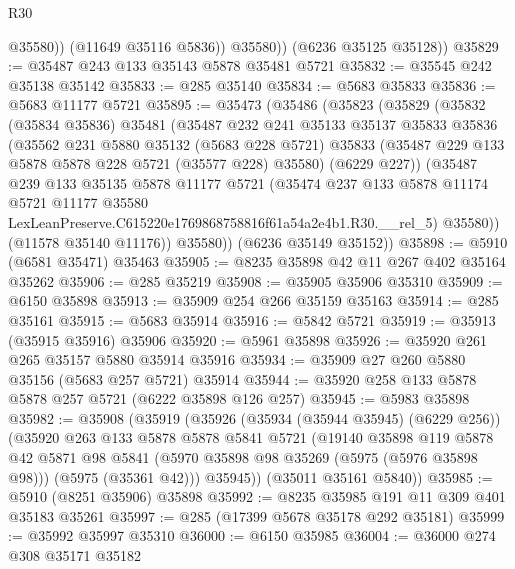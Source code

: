 \begin{lexlean}{R30}
\begin{coremodule}
                @35580))
            (@11649 @35116 @5836))
          @35580))
      (@6236 @35125 @35128))
@35829 := @35487 @243 @133 @35143 @5878 @35481 @5721
@35832 := @35545 @242 @35138 @35142
@35833 := @285 @35140
@35834 := @5683 @35833
@35836 := @5683 @11177 @5721
@35895 := @35473
    (@35486
      (@35823
        (@35829
          (@35832
            (@35834 @35836)
            @35481
            (@35487
              @232
              @241
              @35133
              @35137
              @35833
              @35836
              (@35562
                @231
                @5880
                @35132
                (@5683 @228 @5721)
                @35833
                (@35487 @229 @133 @5878 @5878 @228 @5721 (@35577 @228) @35580)
                (@6229 @227))
              (@35487
                @239
                @133
                @35135
                @5878
                @11177
                @5721
                (@35474
                  @237
                  @133
                  @5878
                  @11174
                  @5721
                  @11177
                  @35580
                  LexLeanPreserve.C615220e1769868758816f61a54a2e4b1.R30.__rel_5)
                @35580))
            (@11578 @35140 @11176))
          @35580))
      (@6236 @35149 @35152))
@35898 := @5910 (@6581 @35471) @35463
@35905 := @8235 @35898 @42 @11 @267 @402 @35164 @35262
@35906 := @285 @35219
@35908 := @35905 @35906 @35310
@35909 := @6150 @35898
@35913 := @35909 @254 @266 @35159 @35163
@35914 := @285 @35161
@35915 := @5683 @35914
@35916 := @5842 @5721
@35919 := @35913 (@35915 @35916) @35906
@35920 := @5961 @35898
@35926 := @35920 @261 @265 @35157 @5880 @35914 @35916
@35934 := @35909 @27 @260 @5880 @35156 (@5683 @257 @5721) @35914
@35944 := @35920 @258 @133 @5878 @5878 @257 @5721 (@6222 @35898 @126 @257)
@35945 := @5983 @35898
@35982 := @35908
    (@35919
      (@35926
        (@35934 (@35944 @35945) (@6229 @256))
        (@35920
          @263
          @133
          @5878
          @5878
          @5841
          @5721
          (@19140
            @35898
            @119
            @5878
            @42
            @5871
            @98
            @5841
            (@5970 @35898 @98 @35269 (@5975 (@5976 @35898 @98)))
            (@5975 (@35361 @42)))
          @35945))
      (@35011 @35161 @5840))
@35985 := @5910 (@8251 @35906) @35898
@35992 := @8235 @35985 @191 @11 @309 @401 @35183 @35261
@35997 := @285 (@17399 @5678 @35178 @292 @35181)
@35999 := @35992 @35997 @35310
@36000 := @6150 @35985
@36004 := @36000 @274 @308 @35171 @35182

\end{coremodule}
\end{lexlean}
